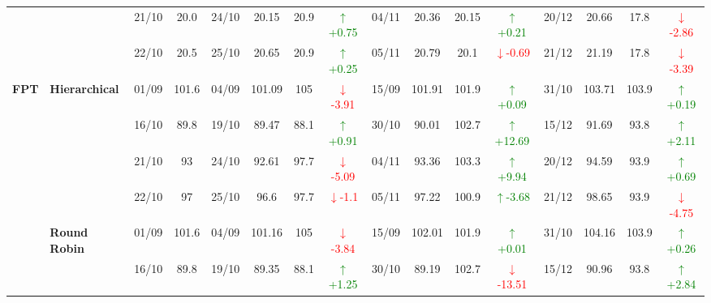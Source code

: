 \documentclass{ieeeaccess}
\begin{document}
{\begin{longtable}{llcc|cccc|cccc|cccc}
&
& 21/10 & 20.0 & 24/10 & 20.15 & 20.9 & \textcolor{green}{\(\uparrow\)+0.75} & 04/11 & 20.36 & 20.15 & \textcolor{green}{\(\uparrow\)+0.21} & 20/12 & 20.66 & 17.8 & \textcolor{red}{\(\downarrow\)-2.86} \\

&
& 22/10 & 20.5 & 25/10 & 20.65 & 20.9 & \textcolor{green}{\(\uparrow\)+0.25} & 05/11 & 20.79 & 20.1 & \textcolor{red}{\(\downarrow\)-0.69} & 21/12 & 21.19 & 17.8 & \textcolor{red}{\(\downarrow\)-3.39} \\
\midrule



\multirow{12}{*}{\textbf{FPT}} 
& \textbf{Hierarchical}
& 01/09 & 101.6 & 04/09 & 101.09 & 105 & \textcolor{red}{\(\downarrow\)-3.91} & 15/09 & 101.91 & 101.9 & \textcolor{green}{\(\uparrow\)+0.09} & 31/10 & 103.71 & 103.9 & \textcolor{green}{\(\uparrow\)+0.19} \\

&
& 16/10 & 89.8 & 19/10 & 89.47 & 88.1 & \textcolor{green}{\(\uparrow\)+0.91} & 30/10 & 90.01 & 102.7 & \textcolor{green}{\(\uparrow\)+12.69} & 15/12 & 91.69 & 93.8 & \textcolor{green}{\(\uparrow\)+2.11} \\

&
& 21/10 & 93 & 24/10 & 92.61 & 97.7 & \textcolor{red}{\(\downarrow\)-5.09} & 04/11 & 93.36 & 103.3 & \textcolor{green}{\(\uparrow\)+9.94} & 20/12 & 94.59 & 93.9 &\textcolor{green}{\(\uparrow\)+0.69}\\

&
& 22/10 & 97 & 25/10 & 96.6 & 97.7 & \textcolor{red}{\(\downarrow\)-1.1} & 05/11 & 97.22 & 100.9 & \textcolor{green}{\(\uparrow\)-3.68} & 21/12 & 98.65 & 93.9 & \textcolor{red}{\(\downarrow\)-4.75} \\
\cmidrule(lr){2-16}


& \textbf{Round Robin}
& 01/09 & 101.6 & 04/09 & 101.16 & 105 & \textcolor{red}{\(\downarrow\)-3.84} & 15/09 & 102.01 & 101.9 & \textcolor{green}{\(\uparrow\)+0.01} & 31/10 & 104.16 & 103.9 & \textcolor{green}{\(\uparrow\)+0.26} \\

&
& 16/10 & 89.8 & 19/10 & 89.35 & 88.1 & \textcolor{green}{\(\uparrow\)+1.25} & 30/10 & 89.19 & 102.7 & \textcolor{red}{\(\downarrow\)-13.51} & 15/12 & 90.96 & 93.8 & \textcolor{green}{\(\uparrow\)+2.84} \\


\end{longtable}}
\end{document}
